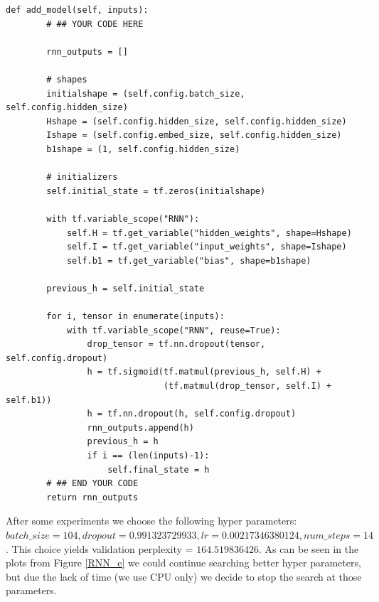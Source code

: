 \documentclass{article}
\begin{document}
\begin{verbatim}
def add_model(self, inputs):
        # ## YOUR CODE HERE

        rnn_outputs = []

        # shapes
        initialshape = (self.config.batch_size, self.config.hidden_size)
        Hshape = (self.config.hidden_size, self.config.hidden_size)
        Ishape = (self.config.embed_size, self.config.hidden_size)
        b1shape = (1, self.config.hidden_size)

        # initializers
        self.initial_state = tf.zeros(initialshape)

        with tf.variable_scope("RNN"):
            self.H = tf.get_variable("hidden_weights", shape=Hshape)
            self.I = tf.get_variable("input_weights", shape=Ishape)
            self.b1 = tf.get_variable("bias", shape=b1shape)

        previous_h = self.initial_state

        for i, tensor in enumerate(inputs):
            with tf.variable_scope("RNN", reuse=True):
                drop_tensor = tf.nn.dropout(tensor, self.config.dropout)
                h = tf.sigmoid(tf.matmul(previous_h, self.H) +
                               (tf.matmul(drop_tensor, self.I) + self.b1))
                h = tf.nn.dropout(h, self.config.dropout)
                rnn_outputs.append(h)
                previous_h = h
                if i == (len(inputs)-1):
                    self.final_state = h
        # ## END YOUR CODE
        return rnn_outputs
\end{verbatim}

After some experiments we choose the following hyper parameters: $ batch\_size=104, dropout=0.991323729933, lr=0.00217346380124, num\_steps=14$. This choice yields validation perplexity = $164.519836426$. As can be seen in the plots from Figure \ref{RNN_e} we could continue searching better hyper parameters, but due the lack of time (we use CPU only) we decide to stop the search at those parameters.
\end{document}
